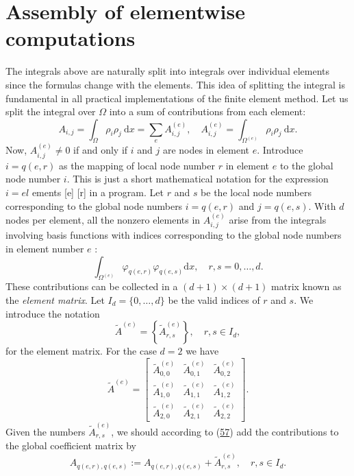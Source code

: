 \documentclass[../main.tex]{subfiles}
\begin{document}
	\section[Assembly of elementwise computations]{Assembly of elementwise computations}
	\label{sec:sec_3_7}
	The integrals above are naturally split into integrals over individual elements since the formulas change with the elements. This idea of splitting the integral is fundamental in all practical implementations of the finite element method.
	Let us split the integral over $\Omega$ into a sum of contributions from each element:
	\begin{equation}\label{eqa57}
		A_{i, j}=\int_{\Omega} \rho_{i} \rho_{j} \mathrm{~d} x=\sum_{e} A_{i, j}^{(e)}, \quad A_{i, j}^{(e)}=\int_{\Omega^{(e)}} \rho_{i} \rho_{j} \mathrm{~d} x.
	\end{equation}
	Now, $A_{i, j}^{(e)} \neq 0$ if and only if $i$ and $j$ are nodes in element $e$. Introduce $i=q(e, r)$ as the mapping of local node number $r$ in element $e$ to the global node number $i$. This is just a short mathematical notation for the expression $i=e l$ ements [e] [r] in a program. Let $r$ and $s$ be the local node numbers corresponding to the global node numbers $i=q(e, r)$ and $j=q(e, s)$. With $d$ nodes per element, all the nonzero elements in $A_{i, j}^{(e)}$ arise from the integrals involving basis functions with indices corresponding to the global node numbers in element number $e$ :
	$$
	\int_{\Omega^{(e)}} \varphi_{q(e, r)} \varphi_{q(e, s)} \mathrm{d} x, \quad r, s=0, \ldots, d .
	$$
	These contributions can be collected in a $(d+1) \times(d+1)$ matrix known as the \textit{element matrix}. Let $I_{d}=\{0, \ldots, d\}$ be the valid indices of $r$ and $s$. We introduce the notation
	$$
	\tilde{A}^{(e)}=\left\{\tilde{A}_{r, s}^{(e)}\right\}, \quad r, s \in I_{d},
	$$
	for the element matrix. For the case $d=2$ we have
	$$
	\tilde{A}^{(e)}=\left[\begin{array}{ccc}
		\tilde{A}_{0,0}^{(e)} & \tilde{A}_{0,1}^{(e)} & \tilde{A}_{0,2}^{(e)} \\
		\tilde{A}_{1,0}^{(e)} & \tilde{A}_{1,1}^{(e)} & \tilde{A}_{1,2}^{(e)} \\
		\tilde{A}_{2,0}^{(e)} & \tilde{A}_{2,1}^{(e)} & \tilde{A}_{2,2}^{(e)}
	\end{array}\right] .
	$$
	Given the numbers $\tilde{A}_{r, s}^{(e)}$, we should according to (\hyperref[eqa57]{57}) add the contributions to the global coefficient matrix by
	\begin{equation}\label{eqa58}
		A_{q(e, r), q(e, s)}:=A_{q(e, r), q(e, s)}+\tilde{A}_{r, s}^{(e)}, \quad r, s \in I_{d} .
	\end{equation}
	
\end{document}
